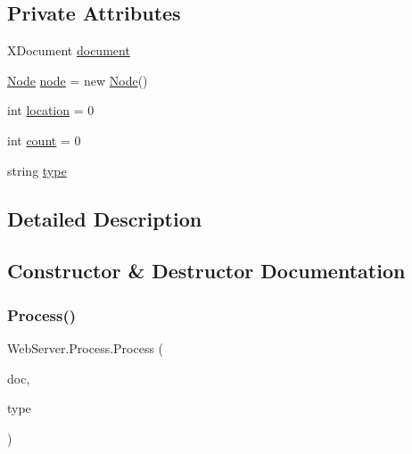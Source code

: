 \subsection*{Private Attributes}
\begin{DoxyCompactItemize}
\item 
X\+Document \hyperlink{class_web_server_1_1_process_a4f27dd3d0d4b003338bdde9058d30493}{document}
\item 
\hyperlink{class_web_server_1_1_node}{Node} \hyperlink{class_web_server_1_1_process_ae62fa93d1a1f981b11418b620bee89d9}{node} = new \hyperlink{class_web_server_1_1_node}{Node}()
\item 
int \hyperlink{class_web_server_1_1_process_a2a5a9fc9ff073f956eadd06d49c89e32}{location} = 0
\item 
int \hyperlink{class_web_server_1_1_process_afee0af2eabd4725990ebc0c550a20014}{count} = 0
\item 
string \hyperlink{class_web_server_1_1_process_ae8a1513688e4d9e54294cff90728ea91}{type}
\end{DoxyCompactItemize}


\subsection{Detailed Description}




\subsection{Constructor \& Destructor Documentation}
\mbox{\label{class_web_server_1_1_process_acaf397891f58f68bf8e1704f9fc8a8b0}} 
\subsubsection{\texorpdfstring{Process()}{Process()}}
{\footnotesize\ttfamily Web\+Server.\+Process.\+Process (\begin{DoxyParamCaption}\item[{X\+Document}]{doc,  }\item[{string}]{type }\end{DoxyParamCaption})\hspace{0.3cm}{\ttfamily [private]}}



